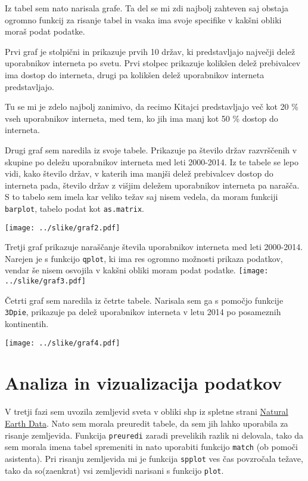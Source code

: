\documentclass[11pt,a4paper]{article}
\begin{document}
\bigskip
Iz tabel sem nato narisala grafe. Ta del se mi zdi najbolj zahteven saj obstaja ogromno funkcij za risanje tabel in vsaka ima svoje specifike v kakšni obliki moraš podat podatke.

\bigskip
Prvi graf je stolpični in prikazuje prvih 10 držav, ki predstavljajo največji delež uporabnikov interneta po svetu. Prvi stolpec prikazuje kolikšen delež prebivalcev ima dostop do interneta, drugi pa kolikšen delež uporabnikov interneta predstavljajo.

Tu se mi je zdelo najbolj zanimivo, da recimo Kitajci predstavljajo več kot 20 \% vseh uporabnikov interneta, med tem, ko jih ima manj kot 50 \% dostop do interneta.



\newpage
Drugi graf sem naredila iz svoje tabele. Prikazuje pa število držav razvrščenih v skupine po deležu uporabnikov interneta med leti 2000-2014. Iz te tabele se lepo vidi, kako število držav, v katerih ima manjši delež prebivalcev dostop do interneta pada, število držav z višjim deležem uporabnikov interneta pa narašča.
S to tabelo sem imela kar veliko težav saj nisem vedela, da moram funkciji \verb|barplot|, tabelo podat kot \verb|as.matrix|.

\texttt{[image: ../slike/graf2.pdf]}

\newpage
Tretji graf prikazuje naraščanje števila uporabnikov interneta med leti 2000-2014. Narejen je s funkcijo \verb|qplot|, ki ima res ogromno možnosti prikaza podatkov, vendar še nisem osvojila v kakšni obliki moram podat podatke. 
\-
\texttt{[image: ../slike/graf3.pdf]}

\newpage
Četrti graf sem naredila iz četrte tabele. Narisala sem ga s pomočjo funkcije \verb|3Dpie|, prikazuje pa delež uporabnikov interneta v letu 2014 po posameznih kontinentih.

\texttt{[image: ../slike/graf4.pdf]}

\newpage


\section{Analiza in vizualizacija podatkov}
V tretji fazi sem uvozila zemljevid sveta v obliki shp iz spletne strani \href{http://www.naturalearthdata.com/http//www.naturalearthdata.com/download/50m/cultural/ne_50m_admin_0_countries.zip}{Natural Earth Data}. Nato sem morala preuredit tabele, da sem jih lahko uporabila za risanje zemljevida. Funkcija \verb|preuredi| zaradi prevelikih razlik ni delovala, tako da sem morala imena tabel spremeniti in nato uporabiti funkcijo \verb|match| (ob pomoči asistenta). Pri risanju zemljevida mi je funkcija \verb|spplot| ves čas povzročala težave, tako da so(zaenkrat) vsi zemljevidi narisani s funkcijo \verb|plot|. 
\end{document}
